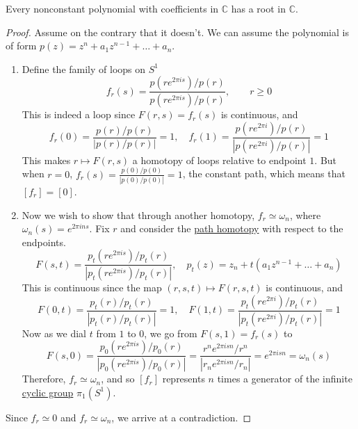 	\begin{theorem}
	  \label{thm:fundamental-theorem-of-algebra}
		Every nonconstant polynomial with coefficients in $\mathbb{C}$ has a root in $\mathbb{C}$. 
	\end{theorem}
	\begin{proof}
		Assume on the contrary that it doesn't. We can assume the polynomial is of form $p(z) = z^n + a_1 z^{n-1} + \ldots + a_n$. 
		\begin{enumerate}
		  \item Define the family of loops on $S^1$ 
				\begin{equation}
					f_r (s) = \frac{p(r e^{2\pi i s}) / p(r)}{p(r e^{2\pi i s}) / p(r)}, \qquad r \geq 0
				\end{equation}
				This is indeed a loop since $F(r, s) = f_r (s)$ is continuous, and 
				\begin{equation}
					f_r (0) = \frac{p(r)/p(r)}{|p(r)/p(r)|} = 1, \quad f_r (1) = \frac{p (r e^{2 \pi i}) / p(r)}{|p (r e^{2 \pi i}) / p(r)|} = 1
				\end{equation}
				This makes $r \mapsto F(r, s)$ a homotopy of loops relative to endpoint $1$. But when $r = 0$, $f_r (s) = \frac{p(0)/p(0)}{|p(0)/p(0)|} = 1$, the constant path, which means that $[f_r] = [0]$. 

			\item Now we wish to show that through another homotopy, $f_r \simeq \omega_n$, where $\omega_n (s) = e^{2 \pi i n s}$. Fix $r$ and consider the \hyperref[def:path-homotopy]{path homotopy} with respect to the endpoints. 
				\begin{equation}
					F(s, t) = \frac{p_t (r e^{2 \pi i s}) / p_t (r)}{|p_t (r e^{2 \pi i s}) / p_t (r)|}, \quad p_t (z) = z_n + t(a_1 z^{n-1} + \ldots + a_n)
				\end{equation}
				This is continuous since the  map $(r, s, t) \mapsto F(r, s, t)$ is continuous, and 
				\begin{equation}
					F(0, t) = \frac{p_t (r)/p_t (r)}{|p_t (r) / p_t (r)|} = 1, \quad F(1, t) = \frac{p_t (r e^{2\pi i}) / p_t (r)}{|p_t (r e^{2\pi i}) / p_t (r)|} = 1
				\end{equation}
				Now as we dial $t$ from $1$ to $0$, we go from $F(s, 1) = f_r (s)$ to 
				\begin{equation}
					F(s, 0) = \frac{p_0 (r e^{2\pi i s}) / p_0 (r)}{|p_0 (r e^{2\pi i s}) / p_0 (r)|} = \frac{r^n e^{2\pi i sn} / r^n}{|r_n e^{2\pi i sn} / r_n|} = e^{2 \pi i sn} = \omega_n(s)
				\end{equation}
				Therefore, $f_r \simeq \omega_n$, and so $[f_r]$ represents $n$ times a generator of the infinite \hyperref[alg-def:cyclic-group]{cyclic group} $\pi_1 (S^1)$. 
		\end{enumerate}

		Since $f_r \simeq 0$ and $f_r \simeq \omega_n$, we arrive at a contradiction. 
	\end{proof}

